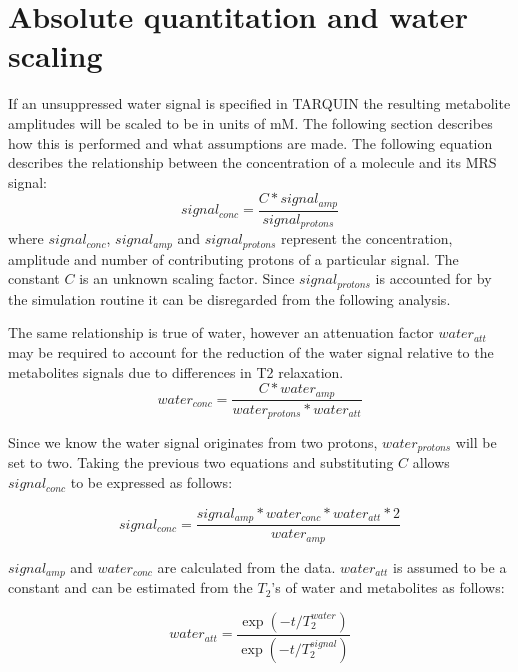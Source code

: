 \documentclass[a4paper,12pt]{article}
\begin{document}
\section{Absolute quantitation and water scaling}
\label{ws}
If an unsuppressed water signal is specified in TARQUIN the resulting metabolite amplitudes will be scaled to be in units of mM.  The following section describes how this is performed and what assumptions are made.
The following equation describes the relationship between the concentration of a molecule and its MRS signal:
\begin{equation}
signal_{conc} = \frac{C * signal_{amp}}{signal_{protons}}
\end{equation}
where $signal_{conc}$, $signal_{amp}$ and $signal_{protons}$ represent the concentration, amplitude and number of contributing protons of a particular signal. The constant $C$ is an unknown scaling factor. Since $signal_{protons}$ is accounted for by the simulation routine it can be disregarded from the following analysis.

The same relationship is true of water, however an attenuation factor $water_{att}$ may be required to account for the reduction of the water signal relative to the metabolites signals due to differences in T2 relaxation.
\begin{equation}
water_{conc} = \frac{C * water_{amp}}{water_{protons} * water_{att}}
\end{equation}

Since we know the water signal originates from two protons, $water_{protons}$ will be set to two.  Taking the previous two equations and substituting $C$ allows $signal_{conc}$ to be expressed as follows:

\begin{equation}
signal_{conc} = \frac{signal_{amp} * water_{conc} * water_{att} * 2}{water_{amp}}
\end{equation}

$signal_{amp}$ and $water_{conc}$ are calculated from the data. $water_{att}$ is assumed to be a constant and can be estimated from the $T_2$'s of water and metabolites as follows:

\begin{equation}
water_{att} = \frac{\exp(-t/T_2^{water})}{\exp(-t/T_2^{signal})}
\end{equation}
\end{document}
